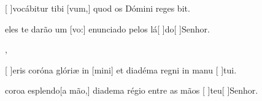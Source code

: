 {  {\item {}[ ]{vo}cábitur tibi [vum,] quod os Dómini reges bit.~\Antiphona}%
    {\item {} eles te darão um [vo:] enunciado pelos lá[ ]{do}[ ]{Se}nhor.~\Antiphona},
  {\item {}[ ]{e}ris coróna glóriæ in [mini] et diadéma regni in manu [ ]{tu}i.~\Antiphona}%
    {\item {} coroa esplendo[a mão,] diadema régio entre as mãos [ ]{teu}[ ]{Se}nhor.~\Antiphona}
}